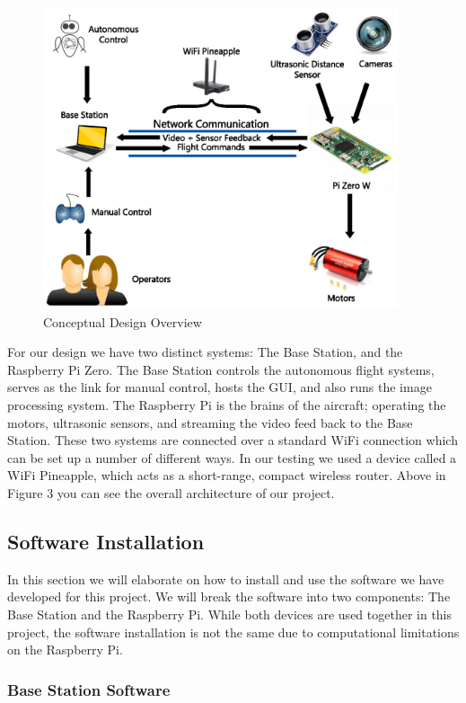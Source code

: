 \documentclass[onecolumn, draftclsnofoot,10pt, compsoc]{IEEEtran}
\begin{document}
\begin{figure}[ht]
\centering
\includegraphics[height=3.5in]{DesignOverview}
\caption{Conceptual Design Overview}
\end{figure}

For our design we have two distinct systems: The Base Station, and the Raspberry Pi Zero. The Base Station controls the autonomous flight systems, serves as the link for manual control, hosts the GUI, and also runs the image processing system. The Raspberry Pi is the brains of the aircraft; operating the motors, ultrasonic sensors, and streaming the video feed back to the Base Station. These two systems are connected over a standard WiFi connection which can be set up a number of different ways. In our testing we used a device called a WiFi Pineapple, which acts as a short-range, compact wireless router. Above in Figure 3 you can see the overall architecture of our project.


\subsection{Software Installation}

In this section we will elaborate on how to install and use the software we have developed for this project. We will break the software into two components: The Base Station and the Raspberry Pi. While both devices are used together in this project, the software installation is not the same due to computational limitations on the Raspberry Pi. 

\subsubsection{Base Station Software}
\end{document}
